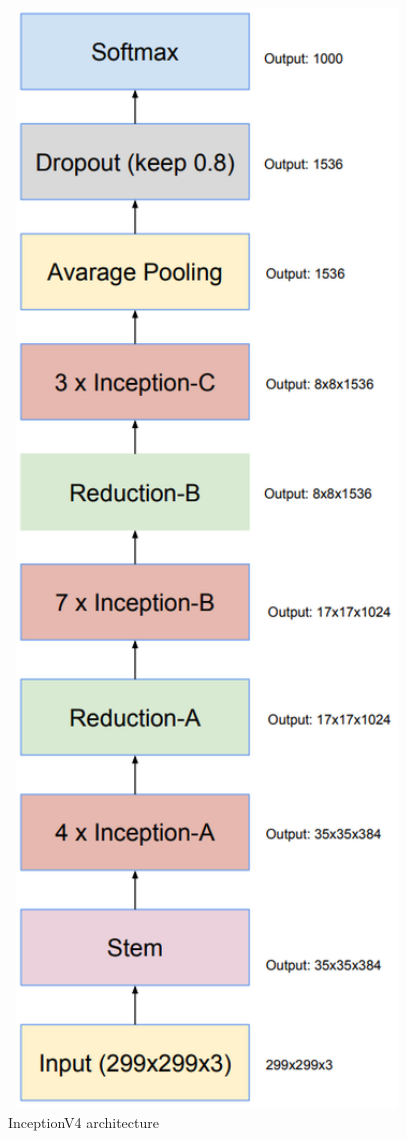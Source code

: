 \begin{figure}[]
\centering
\includegraphics[angle=90,width=0.94\textwidth]{./Bilder/inceptionV4_architecture.png}
\caption{InceptionV4 architecture \cite{InceptionV4}}
\label{fig:inceptionv4}
\end{figure}
